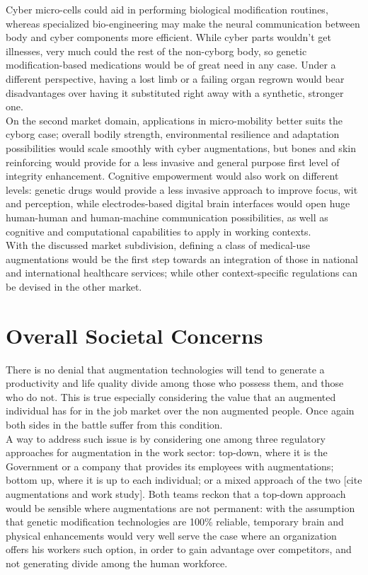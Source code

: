 Cyber micro-cells could aid in performing biological modification routines, whereas specialized bio-engineering may make the neural communication between body and cyber components more efficient. While cyber parts wouldn’t get illnesses, very much could the rest of the non-cyborg body, so genetic modification-based medications would be of great need in any case. Under a different perspective, having a lost limb or a failing organ regrown would bear disadvantages over having it substituted right away with a synthetic, stronger one.\\

On the second market domain, applications in micro-mobility better suits the cyborg case; overall bodily strength, environmental resilience and adaptation possibilities would scale smoothly with cyber augmentations, but bones and skin reinforcing would provide for a less invasive and general purpose first level of integrity enhancement. Cognitive empowerment would also work on different levels: genetic drugs would provide a less invasive approach to improve focus, wit and perception, while electrodes-based digital brain interfaces would open huge human-human and human-machine communication possibilities, as well as cognitive and computational capabilities to apply in working contexts.\\

With the discussed market subdivision, defining a class of medical-use augmentations would be the first step towards an integration of those in national and international healthcare services; while other context-specific regulations can be devised in the other market.


\section*{Overall Societal Concerns}
\label{sec:rec_concerns}

There is no denial that augmentation technologies will tend to generate a productivity and life quality divide among those who possess them, and those who do not. This is true especially considering the value that an augmented individual has for in the job market over the non augmented people. Once again both sides in the battle suffer from this condition.\\

A way to address such issue is by considering one among three regulatory approaches for augmentation in the work sector: top-down, where it is the Government or a company that provides its employees with augmentations; bottom up, where it is up to each individual; or a mixed approach of the two [cite augmentations and work study]. Both teams reckon that a top-down approach would be sensible where augmentations are not permanent: with the assumption that genetic modification technologies are 100\% reliable, temporary brain and physical enhancements would very well serve the case where an organization offers his workers such option, in order to gain advantage over competitors, and not generating divide among the human workforce.\\

